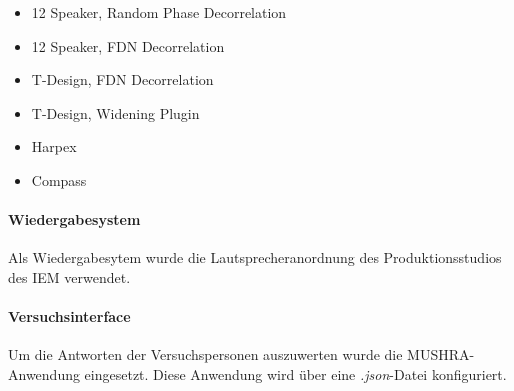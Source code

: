 \begin{itemize}
	\item 12 Speaker, Random Phase Decorrelation
	\item 12 Speaker, FDN Decorrelation
	\item T-Design, FDN Decorrelation
	\item T-Design, Widening Plugin
	\item Harpex
	\item Compass
\end{itemize}


\paragraph{Wiedergabesystem}
Als Wiedergabesytem wurde die Lautsprecheranordnung des Produktionsstudios des IEM verwendet.

\paragraph{Versuchsinterface}
Um die Antworten der Versuchspersonen auszuwerten wurde die MUSHRA-Anwendung eingesetzt. Diese Anwendung wird über eine \textit{.json}-Datei konfiguriert.